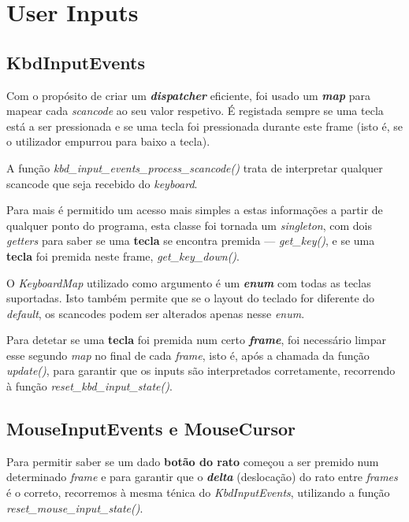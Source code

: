 \documentclass{report}
\begin{document}
\section{User Inputs}

\subsection{KbdInputEvents}

Com o propósito de criar um \textbf{\textit{dispatcher}} eficiente, foi usado um \textbf{\textit{map}} para mapear cada \textit{scancode} ao seu valor respetivo. É registada sempre se uma tecla está a ser pressionada e se uma tecla foi pressionada durante este frame (isto é, se o utilizador empurrou para baixo a tecla).

A função \textit{kbd\_input\_events\_process\_scancode()} trata de interpretar qualquer scancode que seja recebido do \textit{keyboard}.

Para mais é permitido um acesso mais simples a estas informações a partir de qualquer ponto do programa, esta classe foi tornada um \textit{singleton}, com dois \textit{getters} para saber se uma \textbf{tecla} se encontra premida --- \textit{get\_key()}, e se uma \textbf{tecla} foi premida neste frame, \textit{get\_key\_down()}.

O \textit{KeyboardMap} utilizado como argumento é um \textbf{\textit{enum}} com todas as teclas suportadas. Isto também permite que se o layout do teclado for diferente do \textit{default}, os scancodes podem ser alterados apenas nesse \textit{enum}.

Para detetar se uma \textbf{tecla} foi premida num certo \textbf{\textit{frame}}, foi necessário limpar esse segundo \textit{map} no final de cada \textit{frame}, isto é, após a chamada da função \textit{update()}, para garantir que os inputs são interpretados corretamente, recorrendo à função \textit{reset\_kbd\_input\_state()}.

\subsection{MouseInputEvents e MouseCursor}

Para permitir saber se um dado \textbf{botão do rato} começou a ser premido num determinado \textit{frame} e para garantir que o \textbf{\textit{delta}} (deslocação) do rato entre \textit{frames} é o correto, recorremos à mesma ténica do \textit{KbdInputEvents}, utilizando a função \textit{reset\_mouse\_input\_state()}.
\end{document}
